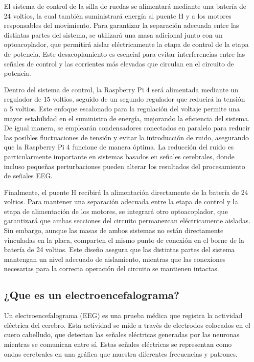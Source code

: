\documentclass{article}
\begin{document}
El sistema de control de la silla de ruedas se alimentará mediante una batería de 24 voltios, la cual también suministrará energía al puente H y a los motores responsables del movimiento. Para garantizar la separación adecuada entre las distintas partes del sistema, se utilizará una masa adicional junto con un optoacoplador, que permitirá aislar eléctricamente la etapa de control de la etapa de potencia. Este desacoplamiento es esencial para evitar interferencias entre las señales de control y las corrientes más elevadas que circulan en el circuito de potencia.

Dentro del sistema de control, la Raspberry Pi 4 será alimentada mediante un regulador de 15 voltios, seguido de un segundo regulador que reducirá la tensión a 5 voltios. Este enfoque escalonado para la regulación del voltaje permite una mayor estabilidad en el suministro de energía, mejorando la eficiencia del sistema. De igual manera, se emplearán condensadores conectados en paralelo para reducir las posibles fluctuaciones de tensión y evitar la introducción de ruido, asegurando que la Raspberry Pi 4 funcione de manera óptima. La reducción del ruido es particularmente importante en sistemas basados en señales cerebrales, donde incluso pequeñas perturbaciones pueden alterar los resultados del procesamiento de señales EEG.

Finalmente, el puente H recibirá la alimentación directamente de la batería de 24 voltios. Para mantener una separación adecuada entre la etapa de control y la etapa de alimentación de los motores, se integrará otro optoacoplador, que garantizará que ambas secciones del circuito permanezcan eléctricamente aisladas. Sin embargo, aunque las masas de ambos sistemas no están directamente vinculadas en la placa, comparten el mismo punto de conexión en el borne de la batería de 24 voltios. Este diseño asegura que las distintas partes del sistema mantengan un nivel adecuado de aislamiento, mientras que las conexiones necesarias para la correcta operación del circuito se mantienen intactas.

\subsection{¿Que es un electroencefalograma?}

Un electroencefalograma (EEG) es una prueba médica que registra la actividad eléctrica del cerebro. Esta actividad se mide a través de electrodos colocados en el cuero cabelludo, que detectan las señales eléctricas generadas por las neuronas mientras se comunican entre sí. Estas señales eléctricas se representan como ondas cerebrales en una gráfica que muestra diferentes frecuencias y patrones.
\end{document}
